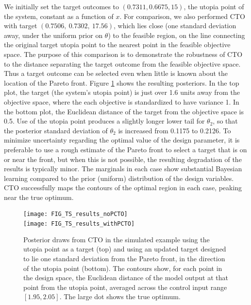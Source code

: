 \documentclass[twocolumn,10pt]{asme2ej}
\begin{document}
We initially set the target outcomes to $(0.7311, 0.6675, 15)$, the utopia point of the system, constant as a function of $x$. 
%
%
For comparison, we also performed CTO with target $(0.7506,\ 0.7302,\ 17.56)$, which lies close (one standard deviation away, under the uniform prior on $\theta$) to the feasible region, on the line connecting the original target utopia point to the nearest point in the feasible objective space.
%
The purpose of this comparison is to demonstrate the robustness of CTO to the distance separating the target outcome from the feasible objective space.
%
Thus a target outcome can be selected even when little is known about the location of the Pareto front.
%
Figure \ref{fig:toy_sim_results} shows the resulting posteriors. %
%
In the top plot, the target (the system's utopia point) is just over 1.6 units away from the objective space, where the each objective is standardized to have variance 1.
%
In the bottom plot, the Euclidean distance of the target from the objective space is 0.5.
%
Use of the utopia point produces a slightly longer lower tail for $\theta_2$, so that the posterior standard deviation of $\theta_2$ is increased from 0.1175 to 0.2126.
%
To minimize uncertainty regarding the optimal value of the design parameter, it is preferable to use a rough estimate of the Pareto front to select a target that is on or near the front, but when this is not possible, the resulting degradation of the results is typically minor.
%
The marginals in each case show substantial Bayesian learning compared to the prior (uniform) distribution of the design variables. 
%
CTO successfully maps the contours of the optimal region in each case, peaking near the true optimum. 
%

%
\begin{figure}
	\centering
	\texttt{[image: FIG\_TS\_results\_noPCTO]}\\
	\vspace{1em}
	\texttt{[image: FIG\_TS\_results\_withPCTO]}
	\caption{Posterior draws from CTO in the simulated example using the utopia point as a target (top) and using an updated target designed to lie one standard deviation from the Pareto front, in the direction of the utopia point (bottom). The contours show, for each point in the design space, the Euclidean distance of the model output at that point from the utopia point, averaged across the control input range $[1.95,2.05]$. The large dot shows the true optimum.}
	\label{fig:toy_sim_results}
\end{figure}
\end{document}
